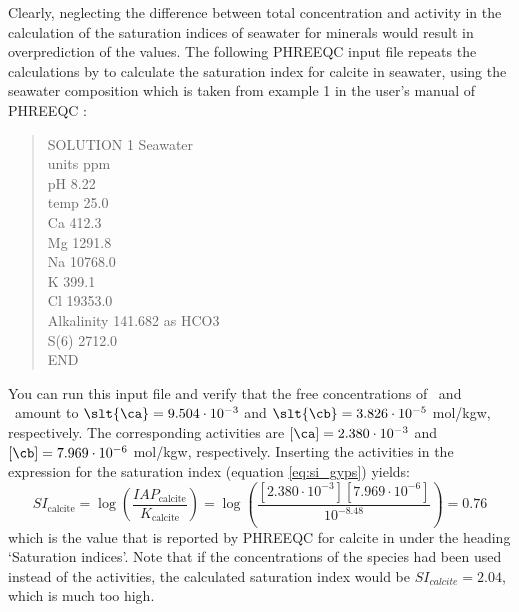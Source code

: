 Clearly, neglecting the difference between total concentration and activity in the calculation of the saturation indices of seawater for minerals would result in overprediction of the values. The following PHREEQC input file repeats the calculations by \citet{garrels_thompson1963} to calculate the saturation index for calcite in seawater, using the seawater composition which is taken from example 1 in the user's manual of PHREEQC \citep{phreeqc2}: 

\begin{quote}
SOLUTION 1 Seawater \\
        units   ppm \\
        pH      8.22 \\
        temp    25.0 \\
        Ca              412.3 \\
        Mg              1291.8 \\
        Na              10768.0 \\
        K               399.1 \\
        Cl              19353.0 \\
        Alkalinity      141.682 as HCO3 \\
        S(6)            2712.0 \\
END
\end{quote}

You can run this input file and verify that the free concentrations of \ca\ and \cb\ amount to $\slt{\ca} = 9.504 \cdot 10^{-3}$ and $\slt{\cb} = 3.826 \cdot 10^{-5}$ mol/kgw, respectively. The corresponding activities are $[\ca] = 2.380 \cdot 10^{-3}$ and $[\cb] = 7.969 \cdot 10^{-6}$ mol/kgw, respectively. Inserting the activities in the expression for the saturation index (equation \ref{eq:si_gyps}) yields:
\begin{equation}
SI_\text{calcite} = \log \left(\frac{IAP_\text{calcite}}{K_\text{calcite}} \right) = \log \left(\frac{[2.380 \cdot 10^{-3}][7.969 \cdot 10^{-6}]}{10^{-8.48}} \right) = 0.76
\end{equation}
which is the value that is reported by PHREEQC for calcite in under the heading `Saturation indices'. Note that if the concentrations of the species had been used instead of the activities, the calculated saturation index would be $SI_{calcite} = 2.04$, which is much too high.

